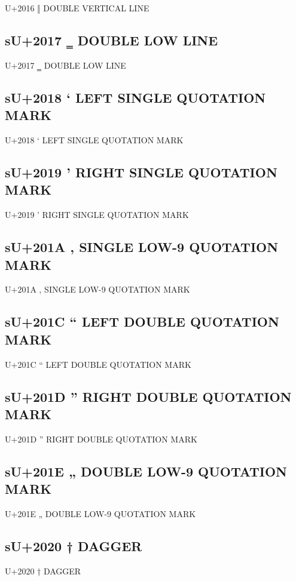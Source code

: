 U+2016 ‖  DOUBLE VERTICAL LINE

\subsection{sU+2017 ‗ DOUBLE LOW LINE}

U+2017 ‗ DOUBLE LOW LINE

\subsection{sU+2018 ‘  LEFT SINGLE QUOTATION MARK}

U+2018 ‘  LEFT SINGLE QUOTATION MARK

\subsection{sU+2019 ’  RIGHT SINGLE QUOTATION MARK}

U+2019 ’  RIGHT SINGLE QUOTATION MARK

\subsection{sU+201A ‚  SINGLE LOW-9 QUOTATION MARK}

U+201A ‚  SINGLE LOW-9 QUOTATION MARK

\subsection{sU+201C “  LEFT DOUBLE QUOTATION MARK}

U+201C “  LEFT DOUBLE QUOTATION MARK

\subsection{sU+201D ”  RIGHT DOUBLE QUOTATION MARK}

U+201D ”  RIGHT DOUBLE QUOTATION MARK

\subsection{sU+201E „  DOUBLE LOW-9 QUOTATION MARK}

U+201E „  DOUBLE LOW-9 QUOTATION MARK

\subsection{sU+2020 †  DAGGER}

U+2020 †  DAGGER

